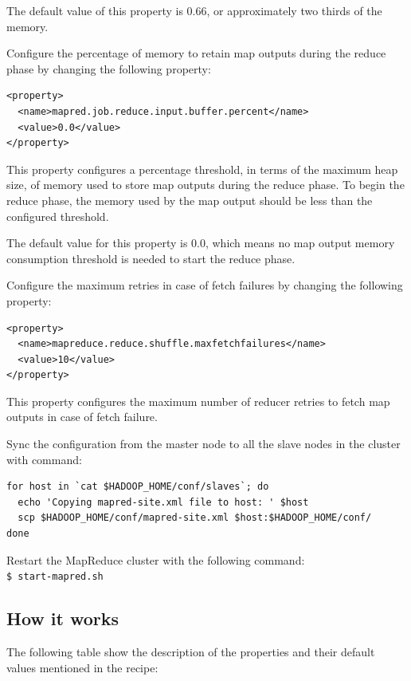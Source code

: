 The default value of this property is 0.66, or approximately two thirds of the memory.

Configure the percentage of memory to retain map outputs during the reduce phase by changing the following property:
\lstset{style=bashstyle}
\begin{lstlisting}
<property>
  <name>mapred.job.reduce.input.buffer.percent</name>
  <value>0.0</value>
</property>
\end{lstlisting}
This property configures a percentage threshold, in terms of the maximum heap size, of memory used to store map outputs during the reduce phase. To begin the reduce phase, the memory used by the map output should be less than the configured threshold.

The default value for this property is 0.0, which means no map output memory consumption threshold is needed to start the reduce phase.

Configure the maximum retries in case of fetch failures by changing the following property:
\lstset{style=bashstyle}
\begin{lstlisting}
<property>
  <name>mapreduce.reduce.shuffle.maxfetchfailures</name>
  <value>10</value>
</property>
\end{lstlisting}

This property configures the maximum number of reducer retries to fetch map outputs in case of fetch failure.

Sync the configuration from the master node to all the slave nodes in the cluster with command:
\lstset{style=bashstyle}
\begin{lstlisting}
for host in `cat $HADOOP_HOME/conf/slaves`; do
  echo 'Copying mapred-site.xml file to host: ' $host
  scp $HADOOP_HOME/conf/mapred-site.xml $host:$HADOOP_HOME/conf/
done
\end{lstlisting}

Restart the MapReduce cluster with the following command: \\
\verb|$ start-mapred.sh|

\subsection*{How it works}
The following table show the description of the properties and their default values mentioned in the recipe: \\

